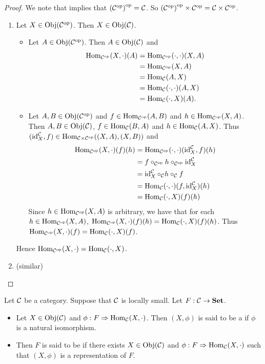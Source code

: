 \documentclass{book}
\begin{document}
\begin{proof}
	We note that \rex{}  implies that $\op{(\op{\MC})} = \MC$. So $\op{(\op{\MC})} \times \op{\MC} = \MC\times \op{\MC}$.
	\begin{enumerate}
		\item Let $X \in \Obj(\op{\MC})$. Then $X \in \Obj(\MC)$.
		\begin{itemize}
			\item Let $A \in \Obj(\op{\MC})$. Then $A \in \Obj(\MC)$ and
			\begin{align*}
				\Hom_{\op{\MC}}(X, \cdot)(A)
				& = \Hom_{\op{\MC}}(\cdot, \cdot)(X, A) \\
				& = \Hom_{\op{\MC}}(X, A) \\
				& = \Hom_{\MC}(A, X) \\
				& = \Hom_{\MC}(\cdot, \cdot)(A, X) \\
				& = \Hom_{\MC}(\cdot, X)(A). 
			\end{align*}
			\item Let $A,B \in \Obj(\op{\MC})$ and $f \in \Hom_{\op{\MC}}(A, B)$ and $h \in \Hom_{\op{\MC}}(X, A)$. Then $A,B \in \Obj(\MC)$, $f \in \Hom_{\MC}(B,A)$ and $h \in \Hom_{\MC}(A, X)$. Thus $(\id_X^{\MC}, f) \in \Hom_{\MC \times \op{\MC}}((X, A), (X, B))$ and
			\begin{align*}
				\Hom_{\op{\MC}}(X, \cdot)(f)(h)
				& = \Hom_{\op{\MC}}(\cdot, \cdot)(\id_X^{\MC}, f)(h) \\
				& = f \circ_{\op{\MC}} h \circ_{\op{\MC}} \id_X^{\MC} \\
				& = \id_X^{\MC} \circ_{\MC} h \circ_{\MC} f \\
				& = \Hom_{\MC}(\cdot, \cdot)(f, \id_X^{\MC})(h) \\
				& = \Hom_{\MC}(\cdot, X)(f)(h)
			\end{align*}
			Since $h \in \Hom_{\op{\MC}}(X, A)$ is arbitrary, we have that for each $h \in \Hom_{\op{\MC}}(X, A)$, $\Hom_{\op{\MC}}(X, \cdot)(f)(h) = \Hom_{\MC}(\cdot, X)(f)(h)$. Thus $\Hom_{\op{\MC}}(X, \cdot)(f) = \Hom_{\MC}(\cdot, X)(f)$.
		\end{itemize}
		Hence $\Hom_{\op{\MC}}(X, \cdot) = \Hom_{\MC}(\cdot, X)$.
		\item {} (similar)
	\end{enumerate}
\end{proof}

\begin{defn} 
	Let $\MC$ be a category. Suppose that $\MC$ is locally small. Let $F: \MC \rightarrow \bSet$. 
	\begin{itemize}
		\item Let $X \in \Obj(\MC)$ and $\phi : F \Rightarrow \Hom_{\MC}(X, \cdot)$. Then $(X, \phi)$ is said to be a  if $\phi$ is a natural isomorphism.
		\item Then $F$ is said to be  if there exists $X \in \Obj(\MC)$ and $\phi:F \Rightarrow \Hom_{\MC}(X, \cdot)$ such that $(X, \phi)$ is a representation of $F$. 
	\end{itemize}
\end{defn}
\end{document}
